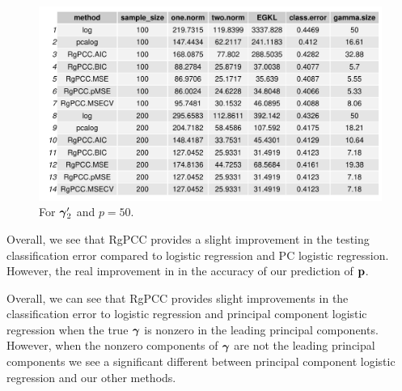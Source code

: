 \documentclass[main.tex]{subfiles}
\begin{document}
\begin{figure}[H]
	\centering
    \includegraphics[width =  \textwidth]{simulated/(sparsity3-nonlead,50)_metrics.pdf}
    \caption{For $\boldsymbol \gamma_2'$ and $p = 50$.}
    \label{fig:simulated2-50}
\end{figure}

Overall, we see that RgPCC provides a slight improvement in the testing classification error compared to logistic regression and PC logistic regression. However, the real improvement in in the accuracy of our prediction of $\mathbf{p}$.

Overall, we can see that RgPCC provides slight improvements in the classification error to logistic regression and principal component logistic regression when the true $\boldsymbol \gamma$ is nonzero in the leading principal components. However, when the nonzero components of $\boldsymbol \gamma$ are not the leading principal components we see a significant different between principal component logistic regression and our other methods.

\end{document}
